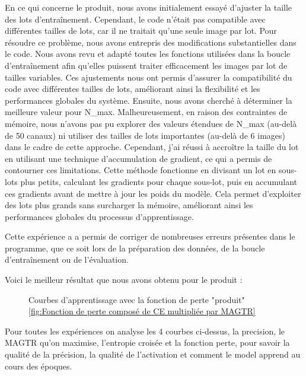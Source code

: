 \documentclass{report}
\begin{document}
{\hspace{1.6cm}En ce qui concerne le produit, nous avons initialement essayé d'ajuster la taille des lots d'entraînement. Cependant, le code n'était pas compatible avec différentes tailles de lots, car il ne traitait qu'une seule image par lot. Pour résoudre ce problème, nous avons entrepris des modifications substantielles dans le code. Nous avons revu et adapté toutes les fonctions utilisées dans la boucle d'entraînement afin qu'elles puissent traiter efficacement les images par lot de tailles variables. Ces ajustements nous ont permis d'assurer la compatibilité du code avec différentes tailles de lots, améliorant ainsi la flexibilité et les performances globales du système. Ensuite, nous avons cherché à déterminer la meilleure valeur pour N\_max. Malheureusement, en raison des contraintes de mémoire, nous n'avons pas pu explorer des valeurs étendues de N\_max (au-delà de 50 canaux) ni utiliser des tailles de lots importantes (au-delà de 6 images) dans le cadre de cette approche. Cependant, j'ai réussi à accroître la taille du lot en utilisant une technique d'accumulation de gradient, ce qui a permis de contourner ces limitations. Cette méthode fonctionne en divisant un lot en sous-lots plus petits, calculant les gradients pour chaque sous-lot, puis en accumulant ces gradients avant de mettre à jour les poids du modèle. Cela permet d'exploiter des lots plus grands sans surcharger la mémoire, améliorant ainsi les performances globales du processus d'apprentissage.

\vspace*{0.5\baselineskip}

\hspace{1.6cm}Cette expérience a a permis de corriger de nombreuses erreurs présentes dans le programme, que ce soit lors de la préparation des données, de la boucle d'entraînement ou de l'évaluation.

Voici le meilleur résultat que nous avons obtenu pour le produit : 

\begin{figure}[htbp] 
	\centering
	\caption{Courbes d'apprentissage avec la fonction de perte "produit" \ref{fig:Fonction de perte composé de CE multipliée par MAGTR}}
	\label{fig:Courbes d'apprentissage avec la fonction de perte "produit"}
\end{figure}

\hspace{1.6cm}Pour toutes les expériences on analyse les 4 courbes ci-dessus, la precision, le MAGTR qu'on maximise, l'entropie croisée et la fonction perte, pour savoir la qualité de la précision, la qualité de l'activation et comment le model apprend au cours des époques. 

}
\end{document}
